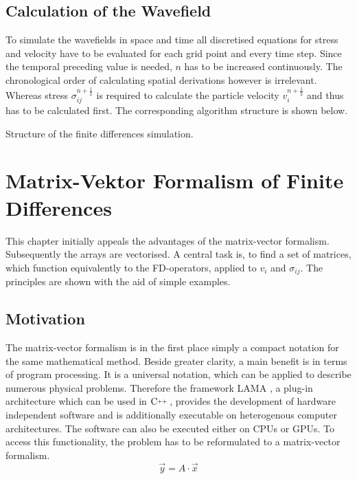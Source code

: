 \documentclass[pdftex,a4paper,parskip,listof=totoc,bibliography=totoc,onehalfspacing,12pt]{scrreprt}
\newcommand{\CC}[1][]{$\text{C\hspace{0ex}}^{_{_{_{++}}}}					%
                      \ifthenelse{\equal{#1}{}}{}{\text{\hspace{-.625ex}#1}}$}
\begin{document}
\section{Calculation of the Wavefield}
To simulate the wavefields in space and time all discretised equations for stress and velocity have to be evaluated for each grid point and every time step. Since the temporal preceding value is needed, $n$ has to be increased continuously. The chronological order of calculating spatial derivations however is irrelevant. Whereas stress $\sigma_{ij}^{n+\frac{1}{2}}$ is required to calculate the particle velocity $v_i^{n+\frac{1}{2}}$ and thus has to be calculated first. The corresponding algorithm structure is shown below. 
\begin{algorithm}
\caption{Structure of the finite differences simulation.}
\label{alg:FD}
\end{algorithm}

\cleardoublepage
\chapter{Matrix-Vektor Formalism of Finite Differences}
This chapter initially appeals the advantages of the matrix-vector formalism. Subsequently the arrays are vectorised. A central task is, to find a set of matrices, which function equivalently to the FD-operators, applied to $v_i$ and $\sigma_{ij}$. The principles are shown with the aid of simple examples. 
\section{Motivation}
The matrix-vector formalism is in the first place simply a compact notation for the same mathematical method. Beside greater clarity, a main benefit is in terms of program processing. It is a universal notation, which can be applied to describe numerous physical problems. Therefore the framework LAMA \citep{lama:16}, a plug-in architecture which can be used in \CC, provides the development of hardware independent software and is additionally executable on heterogenous computer architectures. The software can also be executed either on CPUs or GPUs. To access this functionality, the problem has to be reformulated to a matrix-vector formalism. 
\begin{equation}
	\vec{y} = A\cdot\vec{x}
\end{equation}
\end{document}
